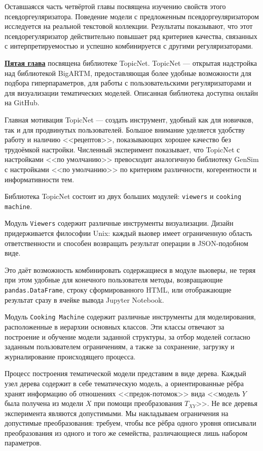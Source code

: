 Оставшаясся часть четвёртой главы посвящена изучению свойств этого псевдоргеуляризатора. Поведение модели с предложенным псевдоргеуляризатором исследуется на реальной текстовой коллекции. Результаты показывают, что этот псевдорегуляризатор действительно повышает ряд критериев качества, связанных с интерпретируемостью и успешно комбинируется с другими регуляризаторами.

\underline{\textbf{Пятая глава}} посвящена библиотеке TopicNet. TopicNet --- открытая надстройка над библиотекой BigARTM, предоставляющая более удобные
возможности для подбора гиперпараметров, для работы с пользовательскими
регуляризаторами и для визуализации тематических моделей. Описанная библиотека доступна онлайн на GitHub.

Главная мотивация TopicNet --- создать инструмент, удобный как для новичков, так и для продвинутых пользователей. Большое внимание уделяется удобству работу и наличию <<рецептов>>, показывающих хорошее качество без трудоёмкой настройки. Численный эксперимент показывает, что TopicNet с настройками <<по умолчанию>> превосходит аналогичную библиотеку GenSim с настройками <<по умолчанию>> по критериям различности, когерентности и информативности тем.

Библиотека TopicNet состоит из двух больших модулей: \texttt{viewers} и \texttt{cooking machine}.  

Модуль \texttt{Viewers} содержит различные инструменты визуализации. Дизайн придерживается философии Unix: каждый вьювер имеет ограниченную область ответственности и способен возвращать результат операции в JSON-подобном виде.

Это даёт возможность комбинировать содержащиеся в модуле вьюверы, не теряя при этом удобные для конечного пользователя методы, возвращающие \texttt{pandas.DataFrame}, строку сформированного HTML, или отображающие результат сразу в ячейке вывода Jupyter Notebook. 

Модуль \texttt{Cooking Machine} содержит различные инструменты для моделирования, расположенные в иерархии основных классов. Эти классы отвечают за построение и обучение модели заданной структуры, за отбор моделей согласно заданным пользователем ограничениям, а также за сохранение, загрузку и журналирование происходящего процесса.

Процесс построения тематической модели представим в виде дерева. Каждый узел дерева содержит в себе тематическую модель, а ориентированные рёбра хранят информацию об отношениях <<предок-потомок>> вида <<модель $Y$ была получена из модели $X$ при помощи преобразования $T_{XY}$>>. Не все деревья эксперимента являются допустимыми. Мы накладываем ограничения на допустимые преобразования: требуем, чтобы все рёбра одного уровня описывали преобразования из одного и того же семейства, различающиеся лишь набором параметров. 

